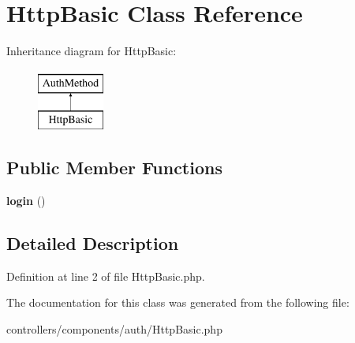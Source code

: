 \hypertarget{class_http_basic}{
\section{HttpBasic Class Reference}
\label{class_http_basic}
}
Inheritance diagram for HttpBasic:\begin{figure}[H]
\begin{center}
\leavevmode
\includegraphics[height=2.000000cm]{class_http_basic}
\end{center}
\end{figure}
\subsection*{Public Member Functions}
\begin{DoxyCompactItemize}
\item 
\hypertarget{class_http_basic_a4c867e9585d4e5e5e78dc6907cb7e15c}{
{\bfseries login} ()}
\label{class_http_basic_a4c867e9585d4e5e5e78dc6907cb7e15c}

\end{DoxyCompactItemize}


\subsection{Detailed Description}


Definition at line 2 of file HttpBasic.php.



The documentation for this class was generated from the following file:\begin{DoxyCompactItemize}
\item 
controllers/components/auth/HttpBasic.php\end{DoxyCompactItemize}
